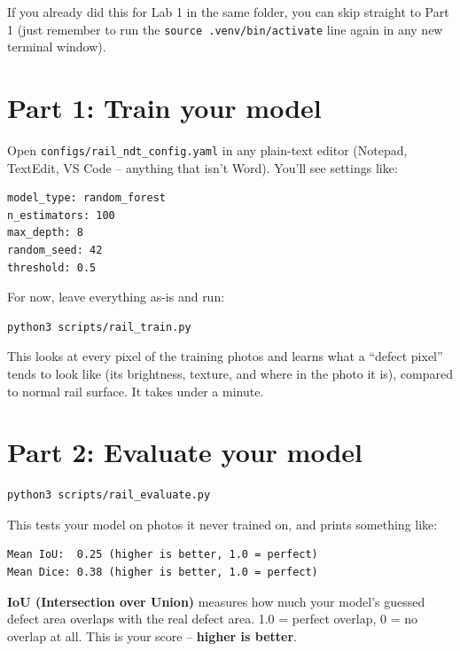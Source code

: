 \documentclass[11pt]{article}
\begin{document}
If you already did this for Lab 1 in the same folder, you can skip straight
to Part 1 (just remember to run the \texttt{source .venv/bin/activate} line
again in any new terminal window).

\section*{Part 1: Train your model}
Open \texttt{configs/rail\_ndt\_config.yaml} in any plain-text editor
(Notepad, TextEdit, VS Code -- anything that isn't Word). You'll see
settings like:

\begin{lstlisting}
model_type: random_forest
n_estimators: 100
max_depth: 8
random_seed: 42
threshold: 0.5
\end{lstlisting}

For now, leave everything as-is and run:

\begin{lstlisting}
python3 scripts/rail_train.py
\end{lstlisting}

This looks at every pixel of the training photos and learns what a ``defect
pixel'' tends to look like (its brightness, texture, and where in the photo
it is), compared to normal rail surface. It takes under a minute.

\section*{Part 2: Evaluate your model}
\begin{lstlisting}
python3 scripts/rail_evaluate.py
\end{lstlisting}

This tests your model on photos it never trained on, and prints something
like:

\begin{lstlisting}
Mean IoU:  0.25 (higher is better, 1.0 = perfect)
Mean Dice: 0.38 (higher is better, 1.0 = perfect)
\end{lstlisting}

\textbf{IoU (Intersection over Union)} measures how much your model's
guessed defect area overlaps with the real defect area. 1.0 = perfect
overlap, 0 = no overlap at all. This is your score -- \textbf{higher is
better}.
\end{document}
